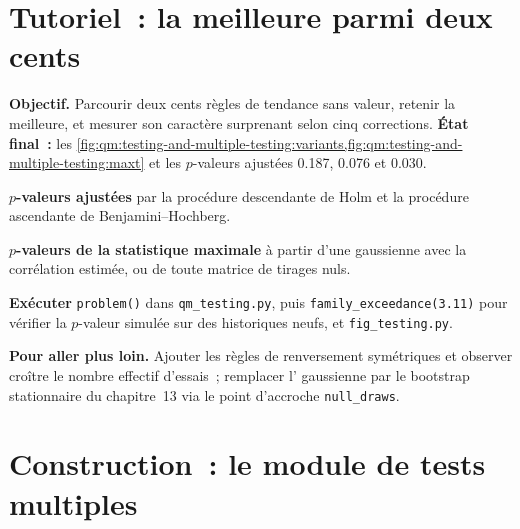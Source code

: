 \section{Tutoriel~: la meilleure parmi deux cents}\label{tut:qm:testing-and-multiple-testing:best}

\begin{tutorial}
\textbf{Objectif.} Parcourir deux cents règles de tendance sans valeur, retenir la meilleure, et mesurer son caractère surprenant selon cinq corrections.
\textbf{État final~:} les \cref{fig:qm:testing-and-multiple-testing:variants,fig:qm:testing-and-multiple-testing:maxt} et les $p$-valeurs ajustées 0.187, 0.076 et 0.030.
\begin{tutsteps}
\item \textbf{$p$-valeurs ajustées} par la procédure descendante de Holm et la procédure ascendante de Benjamini--Hochberg.
\label{lst:qm:testing-and-multiple-testing:holm}
\item \textbf{$p$-valeurs de la statistique maximale} à partir d'une  gaussienne avec la corrélation estimée, ou de toute matrice de tirages nuls.
\label{lst:qm:testing-and-multiple-testing:maxt}
\item \textbf{Exécuter} \texttt{problem()} dans \texttt{qm\_testing.py}, puis \texttt{family\_exceedance(3.11)} pour vérifier la $p$-valeur simulée sur
des historiques neufs, et \texttt{fig\_testing.py}.
\end{tutsteps}
\textbf{Pour aller plus loin.} Ajouter les règles de renversement symétriques et observer croître le nombre effectif d'essais~; remplacer l'
gaussienne par le bootstrap stationnaire du chapitre~13 via le point d'accroche \texttt{null\_draws}.
\end{tutorial}

\section{Construction~: le module de tests multiples}\label{bld:qm:testing-and-multiple-testing:multitest}

